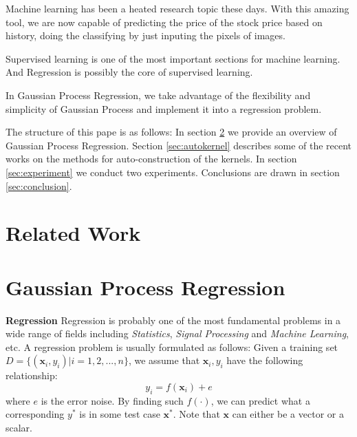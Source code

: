 \documentclass{sig-alternate-05-2015}
\newcommand{\para}[1]{{\vspace{2pt} \bf \noindent #1 \hspace{8pt}}}
\begin{document}
Machine learning has been a heated research topic these days. With this amazing tool, we are now capable of predicting the price of the stock price based on history, doing the classifying by just inputing the pixels of images.

Supervised learning is one of the most important sections for machine learning. And Regression is possibly the core of supervised learning.

In Gaussian Process Regression, we take advantage of the flexibility and simplicity of Gaussian Process and implement it into a regression problem. 




The structure of this pape is as follows: 
In section \ref{sec:intro} we provide an overview of Gaussian Process Regression. 
Section \ref{sec:autokernel} describes some of the recent works on the methods for auto-construction of the kernels.
In section \ref{sec:experiment} we conduct two experiments.
Conclusions are drawn in section \ref{sec:conclusion}.



\section{Related Work}





\newpage
\section{Gaussian Process Regression} \label{sec:intro}

\para{Regression}
Regression is probably one of the most fundamental problems in a wide range of fields including \emph{Statistics}, \emph{Signal Processing} and \emph{Machine Learning}, etc. A regression problem is usually formulated as follows:
Given a training set $D = \{ (\textbf{x}_{i}, y_{i}) | i = 1,2,...,n \}$, we assume that $\textbf{x}_{i}, y_{i}$ have the following relationship:
	\begin{equation}
		y_{i} = f(\textbf{x}_{i}) + e
	\end{equation}
where $e$ is the error noise. By finding such $f(\cdot)$, we can predict what a corresponding $y^{*}$ is in some test case $\textbf{x}^{*}$. Note that $\textbf{x}$ can either be a vector or a scalar.
\end{document}
